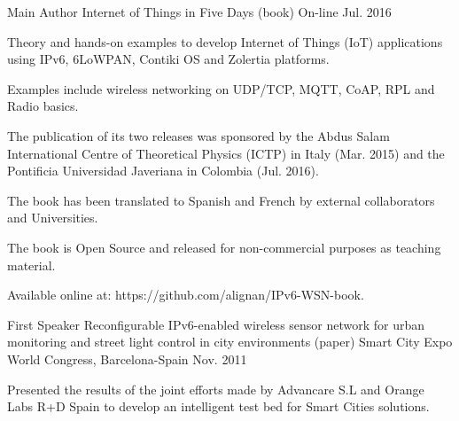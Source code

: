

\begin{cventries}

  \cventry
    {Main Author} %
    {Internet of Things in Five Days (book)} %
    {On-line} %
    {Jul. 2016} %
    {
      \begin{cvitems} %
        \item {Theory and hands-on examples to develop Internet of Things (IoT) applications using IPv6, 6LoWPAN, Contiki OS and Zolertia platforms.}
        \item {Examples include wireless networking on UDP/TCP, MQTT, CoAP, RPL and Radio basics.}
        \item {The publication of its two releases was sponsored by the Abdus Salam International Centre of Theoretical Physics (ICTP) in Italy (Mar. 2015) and the Pontificia Universidad Javeriana in Colombia (Jul. 2016).}
        \item {The book has been translated to Spanish and French by external collaborators and Universities.}
        \item {The book is Open Source and released for non-commercial purposes as teaching material.}
        \item {Available online at: https://github.com/alignan/IPv6-WSN-book.}
      \end{cvitems}
    }

  \cventry
    {First Speaker} %
    {Reconfigurable IPv6-enabled wireless sensor network for urban monitoring and street light control in city environments (paper)} %
    {Smart City Expo World Congress, Barcelona-Spain} %
    {Nov. 2011} %
    {
      \begin{cvitems} %
        \item {Presented the results of the joint efforts made by Advancare S.L and Orange Labs R+D Spain to develop an intelligent test bed for Smart Cities solutions.}
      \end{cvitems}
    }

\end{cventries}
